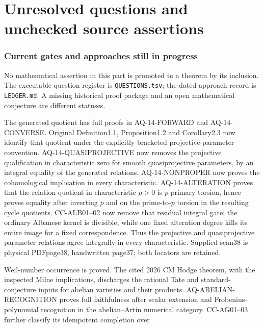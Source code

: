 \documentclass[11pt,a4paper]{article}
\theoremstyle{definition}\newtheorem{definition}[theorem]{Definition}
\theoremstyle{remark}\newtheorem{remark}[theorem]{Remark}
\begin{document}
\clearpage
\part{Unresolved questions and unchecked source assertions}
\section{Current gates and approaches still in progress}
No mathematical assertion in this part is promoted to a theorem by
its inclusion. The executable question register is \nolinkurl{QUESTIONS.tsv};
the dated approach record is \nolinkurl{LEDGER.md}. A missing historical
proof package and an open mathematical conjecture are different statuses.

\begin{description}[style=nextline,leftmargin=0pt,labelwidth=0pt,labelsep=0pt]
\item[Cote 14, scans 25--38: original quotient identification.]
The generated quotient has full proofs in AQ-14-FORWARD and
AQ-14-CONVERSE. Original Definition1.1, Proposition1.2 and
Corollary2.3 now identify that quotient under the explicitly bracketed
projective-parameter convention. AQ-14-QUASIPROJECTIVE now removes the projective qualification
in characteristic zero for smooth quasiprojective parameters, by an
integral equality of the generated relations. AQ-14-NONPROPER now
proves the cohomological implication in every characteristic.
AQ-14-ALTERATION proves that the relation quotient in characteristic
$p>0$ is $p$-primary torsion, hence proves equality after inverting $p$
and on the prime-to-$p$ torsion in the resulting cycle quotients.
CC-ALB01--02 now remove that residual integral gate: the ordinary
Albanese kernel is divisible, while one fixed alteration degree kills
its entire image for a fixed correspondence. Thus the projective and
quasiprojective parameter relations agree integrally in every
characteristic. Supplied scan38 is physical PDFpage38,
handwritten page37; both locators are retained.
\item[Cote 15, scans 100--106: full simple-motive classification.]
Weil-number occurrence is proved. The cited 2026 CM Hodge theorem,
with the inspected Milne implications, discharges the rational Tate and
standard-conjecture inputs for abelian varieties and their products.
AQ-ABELIAN-RECOGNITION proves full faithfulness after scalar extension
and Frobenius-polynomial recognition in the abelian--Artin numerical
category. CC-AG01--03 further classify its idempotent completion over

\end{description}
\end{document}

